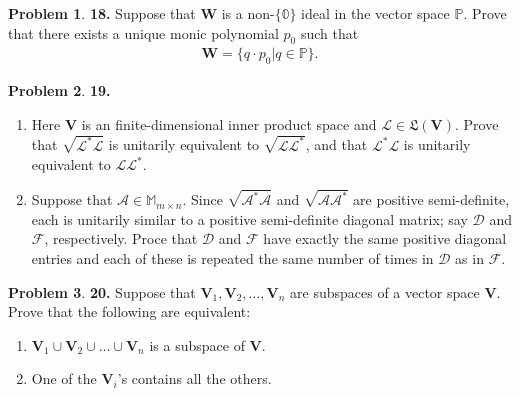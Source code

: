 \documentclass{article}
\theoremstyle{definition}
\newtheorem*{prob*}{Problem}
\newcommand{\F}{\mathcal{F}}
\newcommand{\V}{\mathbf{V}}
\newcommand{\W}{\mathbf{W}}
\newcommand{\A}{\mathcal{A}}
\newcommand{\lag}{\mathcal{L}}
\newcommand{\poly}{\mathbb{P}}
\newcommand{\LL}{\mathfrak{L}}
\begin{document}
\newpage



\begin{prob*}\textbf{18.} Suppose that $\W$ is a non-$\{ \mathbb{0} \}$ ideal in the vector space $\poly$. Prove that there exists a unique monic polynomial $p_0$ such that
	\begin{align*}
	\W = \{ q \cdot p_0 \vert q \in \poly \}.
	\end{align*}
	
\end{prob*}





\newpage



\begin{prob*}\textbf{19.} 
	\begin{enumerate}
		\item Here $\V$ is an finite-dimensional inner product space and $\lag \in \LL(\V)$. Prove that $\sqrt{\lag^*\lag}$ is unitarily equivalent to $\sqrt{\lag\lag^*}$, and that $\lag^*\lag$ is unitarily equivalent to $\lag \lag^*$.
		
		
		\item Suppose that $\A \in \mathbb{M}_{m\times n}$. Since $\sqrt{\A^*\A}$ and $\sqrt{\A\A^*}$ are positive semi-definite, each is unitarily similar to a positive semi-definite diagonal matrix; say $\mathcal{D}$ and $\F$, respectively. Proce that $\mathcal{D}$ and $\F$ have exactly the same positive diagonal entries and each of these is repeated the same number of times in $\mathcal{D}$ as in $\F$.
	\end{enumerate}
	
	
	
\end{prob*}





\newpage





\begin{prob*}\textbf{20.} Suppose that $\V_1, \V_2, \dots, \V_n$ are subspaces of a vector space $\V$. Prove that the following are equivalent:
	
	\begin{enumerate}
		\item $\V_1 \cup \V_2 \cup \dots \cup \V_n$ is a subspace of $\V$.
		
		\item One of the $\V_i$'s contains all the others. 
	\end{enumerate}
	
\end{prob*}
\end{document}
